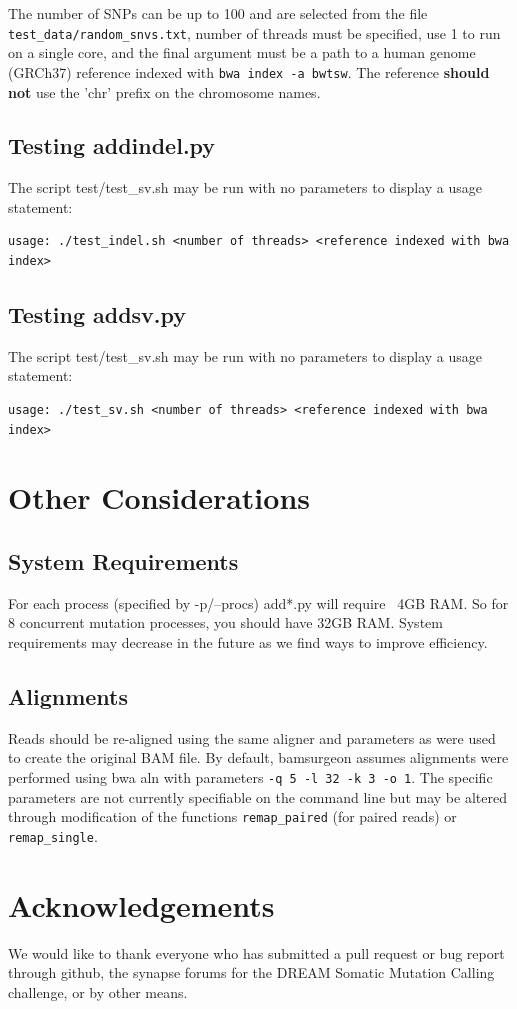 \documentclass[letterpaper,11pt]{article}
\begin{document}
The number of SNPs can be up to 100 and are selected from the file \texttt{test\_data/random\_snvs.txt}, number of threads must be specified, use 1 to run on a single core, and the final argument must be a path to a human genome (GRCh37) reference indexed with \texttt{bwa index -a bwtsw}. The reference \textbf{should not} use the 'chr' prefix on the chromosome names.

\subsection{Testing addindel.py}
The script {test/test\_sv.sh} may be run with no parameters to display a usage statement:
\begin{verbatim}
usage: ./test_indel.sh <number of threads> <reference indexed with bwa index>
\end{verbatim}

\subsection{Testing addsv.py}
The script {test/test\_sv.sh} may be run with no parameters to display a usage statement:
\begin{verbatim}
usage: ./test_sv.sh <number of threads> <reference indexed with bwa index>
\end{verbatim}



\section{Other Considerations}
\subsection{System Requirements}
For each process (specified by -p/--procs) add*.py will require ~4GB RAM. So for 8 concurrent mutation processes, you should have 32GB RAM. System requirements may decrease in the future as we find ways to improve efficiency.

\subsection{Alignments}
Reads should be re-aligned using the same aligner and parameters as were used to create the original BAM file. By default, bamsurgeon assumes alignments were performed using bwa aln with parameters \texttt{-q 5 -l 32 -k 3 -o 1}. The specific parameters are not currently specifiable on the command line but may be altered through modification of the functions \texttt{remap\_paired} (for paired reads) or \texttt{remap\_single}.

\section{Acknowledgements}
We would like to thank everyone who has submitted a pull request or bug report through github, the synapse forums for the DREAM Somatic Mutation Calling challenge, or by other means.
\end{document}
